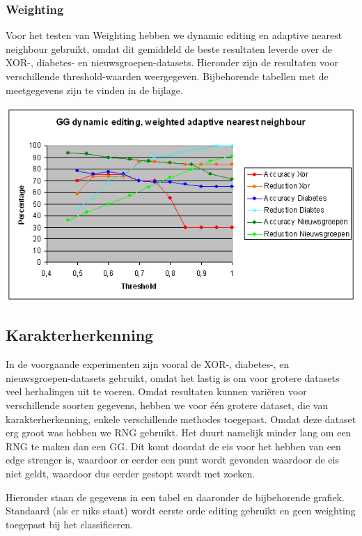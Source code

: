 \documentclass{article}
\begin{document}
\subsubsection{Weighting}
Voor het testen van Weighting hebben we dynamic editing en adaptive nearest neighbour gebruikt, omdat dit gemiddeld de beste resultaten leverde over de XOR-, diabetes- en nieuwsgroepen-datasets.  Hieronder zijn de resultaten voor verschillende threshold-waarden weergegeven. Bijbehorende tabellen met de meetgegevens zijn te vinden in de bijlage.
\begin{center} \includegraphics[scale=0.7]{GG_dynamic_adaptive} \end{center}

\subsection{Karakterherkenning}
In de voorgaande experimenten zijn vooral de XOR-, diabetes-, en nieuwsgroepen-datasets gebruikt, omdat het lastig is om voor grotere datasets veel herhalingen uit te voeren. Omdat resultaten kunnen variëren voor verschillende soorten gegevens, hebben we voor \'{e}\'{e}n grotere dataset, die van karakterherkenning, enkele verschillende methodes toegepast. 
Omdat deze dataset erg groot was hebben we RNG gebruikt. Het duurt namelijk minder lang om een RNG te maken dan een GG. Dit komt doordat de eis voor het hebben van een edge strenger is, waardoor er eerder een punt wordt gevonden waardoor de eis niet geldt, waardoor dus eerder gestopt wordt met zoeken.

Hieronder staan de gegevens in een tabel en daaronder de bijbehorende grafiek. Standaard (als er niks staat) wordt eerste orde editing gebruikt en geen weighting toegepast bij het classificeren.
\end{document}

